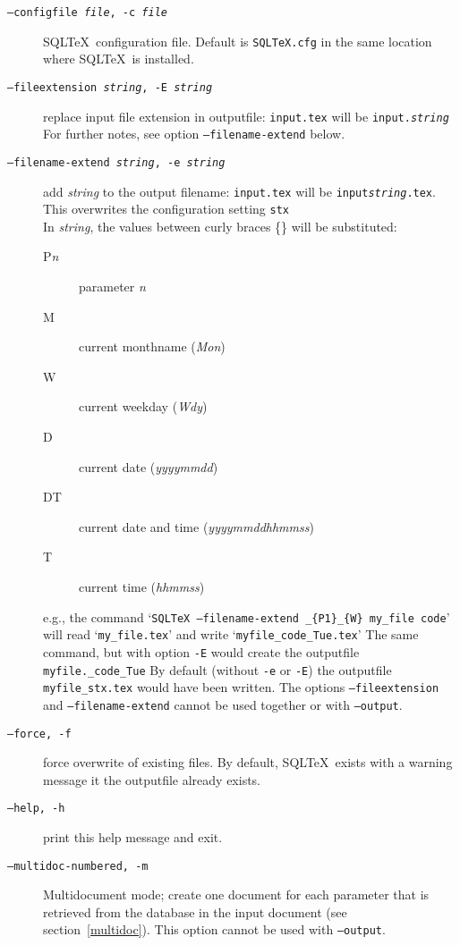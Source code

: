 \documentclass{article}
\begin{document}
\begin{description}
\item[\texttt{--configfile \textit{file}, -c \textit{file}}] SQL\TeX\ configuration file. Default is \texttt{SQLTeX.cfg}
in the same location where SQL\TeX\ is installed.

\item[\texttt{--fileextension \textit{string}, -E \textit{string}}] replace input file extension in outputfile:
\texttt{input.tex} will be \texttt{input.\textit{string}} \\
For further notes, see option \texttt{--filename-extend} below.

\item[\texttt{--filename-extend \textit{string}, -e \textit{string}}] add \textit{string} to the output filename:
\texttt{input.tex} will be \texttt{input\textit{string}.tex}. This overwrites
the configuration setting \texttt{stx} \\
In \textit{string}, the values between curly braces \{\} will be substituted:
\begin{description}
\item[P\textit{n}] parameter \textit{n}
\item[M] current monthname (\textit{Mon})
\item[W] current weekday (\textit{Wdy})
\item[D] current date (\textit{yyyymmdd})
\item[DT] current date and time (\textit{yyyymmddhhmmss})
\item[T] current time (\textit{hhmmss})
\end{description}
e.g., the command `\texttt{SQLTeX --filename-extend \_\{P1\}\_\{W\} my\_file code}'
will read `\texttt{my\_file.tex}' and write `\texttt{myfile\_code\_Tue.tex}'
The same command, but with option \texttt{-E} would create the outputfile \texttt{myfile.\_code\_Tue}
By default (without \texttt{-e} or \texttt{-E}) the outputfile \texttt{myfile\_stx.tex} would have been written.
The options \texttt{--fileextension} and \texttt{--filename-extend} cannot be used together or with \texttt{--output}.

\item[\texttt{--force, -f}] force overwrite of existing files. By default, SQL\TeX\ exists with a
warning message it the outputfile already exists.

\item[\texttt{--help, -h}] print this help message and exit.

\item[\texttt{--multidoc-numbered, -m}] Multidocument mode; create one document for each parameter that is retrieved
from the database in the input document (see section~\ref{multidoc}). This option cannot be used with \texttt{--output}.


\end{description}
\end{document}
